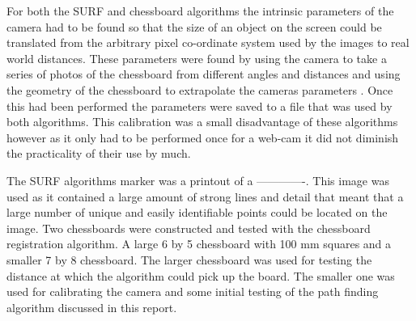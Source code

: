 For both the SURF and chessboard algorithms the intrinsic parameters of the camera had to be found so that the size of an object on the screen could be translated from the arbitrary pixel co-ordinate system used by the images to real world distances. These parameters were found by using the camera to take a series of photos of the chessboard from different angles and distances and using the geometry of the chessboard to extrapolate the cameras parameters \cite{cali}. Once this had been performed the parameters were saved to a file that was used by both algorithms. This calibration was a small disadvantage of these algorithms however as it only had to be performed once for a web-cam it did not diminish the practicality of their use by much.

The SURF algorithms marker was a printout of a -------------. This image was used as it contained a large amount of strong lines and detail that meant that a large number of unique and easily identifiable points could be located on the image. Two chessboards were constructed and tested with the chessboard registration algorithm. A large 6 by 5 chessboard with 100 mm squares and a smaller 7 by 8 chessboard. The larger chessboard was used for testing the distance at which the algorithm could pick up the board. The smaller one was used for calibrating the camera and some initial testing of the path finding algorithm discussed in this report. 